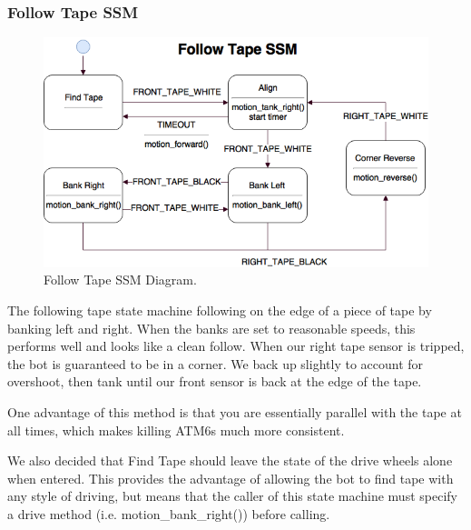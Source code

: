 \documentclass[]{article}
\begin{document}
\subsubsection{Follow Tape SSM}
\begin{figure}[H]
    \centering
    \includegraphics[scale=0.60]{follow-tape-ssm.png}
    \caption{Follow Tape SSM Diagram.}
    \label{fig: follow tape ssm}
\end{figure}

The following tape state machine following on the edge of a piece of tape by banking left and right. When the banks are set to reasonable speeds, this performs well and looks like a clean follow. When our right tape sensor is tripped, the bot is guaranteed to be in a corner. We back up slightly to account for overshoot, then tank until our front sensor is back at the edge of the tape. 

One advantage of this method is that you are essentially parallel with the tape at all times, which makes killing ATM6s much more consistent.

We also decided that Find Tape should leave the state of the drive wheels alone when entered. This provides the advantage of allowing the bot to find tape with any style of driving, but means that the caller of this state machine must specify a drive method (i.e. motion\_bank\_right()) before calling.
\end{document}
